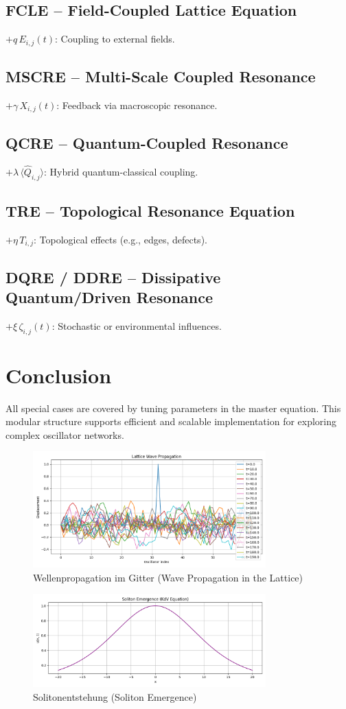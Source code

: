 \documentclass[12pt]{article}
\begin{document}
\subsection*{FCLE -- Field-Coupled Lattice Equation}
$+ q\, E_{i,j}(t)$: Coupling to external fields.

\subsection*{MSCRE -- Multi-Scale Coupled Resonance}
$+ \gamma\, X_{i,j}(t)$: Feedback via macroscopic resonance.

\subsection*{QCRE -- Quantum-Coupled Resonance}
$+ \lambda\, \langle \hat{Q}_{i,j} \rangle$: Hybrid quantum-classical coupling.

\subsection*{TRE -- Topological Resonance Equation}
$+ \eta\, T_{i,j}$: Topological effects (e.g., edges, defects).

\subsection*{DQRE / DDRE -- Dissipative Quantum/Driven Resonance}
$+ \xi\, \zeta_{i,j}(t)$: Stochastic or environmental influences.

\section*{Conclusion}
All special cases are covered by tuning parameters in the master equation. This modular structure supports efficient and scalable implementation for exploring complex oscillator networks.

\begin{figure}[H]
\centering
\includegraphics[width=0.8\textwidth]{lattice_wave_propagation.png}
\caption{Wellenpropagation im Gitter (Wave Propagation in the Lattice)}
\end{figure}

\begin{figure}[H]
\centering
\includegraphics[width=0.8\textwidth]{soliton_emergence.png}
\caption{Solitonentstehung (Soliton Emergence)}
\end{figure}
\end{document}

